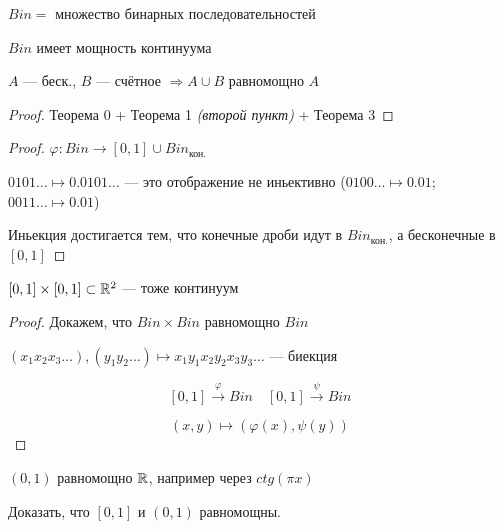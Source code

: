     \begin{theorem}
        $Bin=$ множество бинарных последовательностей

        $Bin$ имеет мощность континуума
    \end{theorem}
    \begin{lemma}
        $A$ --- беск., $B$ --- счётное $\Rightarrow A\cup B$ равномощно $A$
    \end{lemma}
    \begin{proof}
        Теорема 0 + Теорема 1 \textit{(второй пункт)} + Теорема 3
    \end{proof}
    \begin{proof}
        $\varphi : Bin\to [0,1]\cup Bin_{\text{кон.}}$

        $0101\ldots\mapsto0.0101\ldots$ --- это отображение не иньективно ($0100\ldots\mapsto0.01$; $0011\ldots\mapsto0.01$)

        Иньекция достигается тем, что конечные дроби идут в $Bin_{\text{кон.}}$, а бесконечные в $[0,1]$
    \end{proof}
    \begin{consequence}
        $[0,1]\times[0,1]\subset\mathbb{R}^2$ --- тоже континуум
    \end{consequence}
    \begin{proof}
        Докажем, что $Bin\times Bin$ равномощно $Bin$

        $(x_1x_2x_3\ldots), (y_1y_2\ldots)\mapsto x_1y_1x_2y_2x_3y_3\ldots$ --- биекция

        $$[0,1]\xrightarrow{\varphi} Bin \quad [0,1]\xrightarrow \psi Bin$$

        $$(x,y)\mapsto (\varphi(x), \psi(y))$$
    \end{proof}
    \begin{remark}
        $(0,1)$ равномощно $\mathbb{R}$, например через $ctg(\pi x)$
    \end{remark}

    \begin{exercise}
        Доказать, что $[0,1]$ и $(0,1)$ равномощны.
    \end{exercise}

